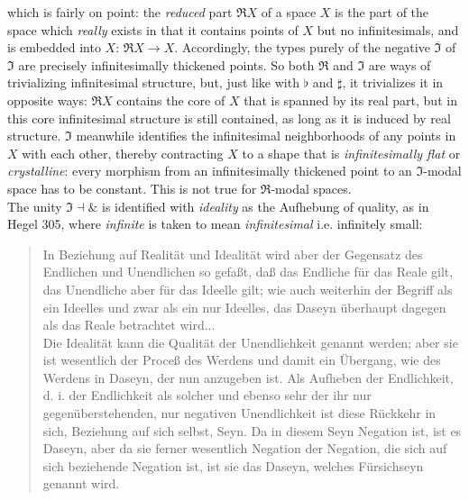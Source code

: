 \documentclass{article}
\begin{document}
which is fairly on point: the \emph{reduced} part $\Re X$ of a space $X$ is the part of the space which
\emph{really} exists in that it contains points of $X$ but no infinitesimals, and is embedded into $X$: $\Re
X\rightarrow X$. Accordingly, the types purely of the negative $\overline{\Im}$ of $\Im$ are precisely
infinitesimally thickened points. So both $\Re$ and $\Im$ are ways of trivializing infinitesimal structure,
but, just like with $\flat$ and  $\sharp$, it trivializes it in opposite ways: $\Re X$ contains the core of
$X$ that is spanned by its real part, but in this core infinitesimal structure is still contained, as long as it is induced by real structure. $\Im$ meanwhile identifies the infinitesimal neighborhoods of any points in $X$ with each other, thereby contracting $X$ to a shape that is \emph{infinitesimally flat} or \emph{crystalline}: every morphism from an infinitesimally thickened point to an $\Im$-modal space has to be constant. This is not true for $\Re$-modal spaces. \\ 

The unity $\Im\dashv\&$ is identified with \emph{ideality} as the Aufhebung of quality, as in Hegel 305,
where \emph{infinite} is taken to mean \emph{infinitesimal} i.e. infinitely small:

\begin{quote}
    In Beziehung auf Realität und Idealität wird aber der Gegensatz des Endlichen und Unendlichen so gefaßt, daß das Endliche für das Reale gilt, das Unendliche aber für das Ideelle gilt; wie auch weiterhin der Begriff als ein Ideelles und zwar als ein nur Ideelles, das Daseyn überhaupt dagegen als das Reale betrachtet wird... \\

    Die Idealität kann die Qualität der Unendlichkeit genannt werden; aber sie ist wesentlich der Proceß des Werdens und damit ein Übergang, wie des Werdens in Daseyn, der nun anzugeben ist. Als Aufheben der Endlichkeit, d. i. der Endlichkeit als solcher und ebenso sehr der ihr nur gegenüberstehenden, nur negativen Unendlichkeit ist diese Rückkehr in sich, Beziehung auf sich selbst, Seyn. Da in diesem Seyn Negation ist, ist es Daseyn, aber da sie ferner wesentlich Negation der Negation, die sich auf sich beziehende Negation ist, ist sie das Daseyn, welches Fürsichseyn genannt wird.
\end{quote}
\end{document}
